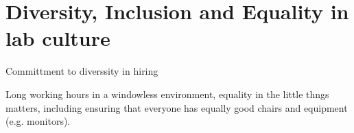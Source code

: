 \documentclass[11pt]{article}
\begin{document}
\section{Diversity, Inclusion and Equality in lab culture}


Committment to diverssity in hiring

Long working hours in a windowless environment, equality in the little thngs matters, including ensuring that everyone has equally good chairs and equipment (e.g. monitors).
















\end{document}
